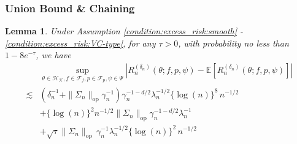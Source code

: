 \documentclass[12pt]{article}
\newtheorem{lemma}{Lemma}%
\newcommand{\E}{\mathbb{E}}
\begin{document}
\subsubsection{Union Bound \& Chaining}
\begin{lemma}\label{lemma:empirical_process_weak_convergence_rate}
Under Assumption \ref{condition:excess_risk:smooth} - \ref{condition:excess_risk:VC-type}, for any $\tau>0$, with probability no less than $1-8e^{-\tau}$, we have
\begin{align*}
    &\sup_{\theta\in\mathcal{H}_\mathcal{K}, f\in\mathcal{F}_f, p\in\mathcal{F}_p, \psi\in\Psi}\left|R_n^{(\delta_n)}(\theta;f,p,\psi)-\E[R_n^{(\delta_n)}(\theta;f,p,\psi)]\right|\\\lesssim & \left(\delta_n^{-1}+\|\Sigma_n\|_{\mathrm{op}}\gamma_n^{-1}\right)\gamma_n^{-1-d/2}\lambda_n^{-1/2}\{\log(n)\}^{8}\,n^{-1/2}\\
& + \{\log(n)\}^2 n^{-1/2}\|\Sigma_n\|_{\mathrm{op}}\gamma_n^{-1-d/2}\lambda_n^{-1}\\
& + \sqrt{\tau} \|\Sigma_n\|_{\mathrm{op}}\,\gamma_n^{-1}\lambda_n^{-1/2}\{\log(n)\}^2\,n^{-1/2}
\end{align*}


    
\end{lemma}
\end{document}
